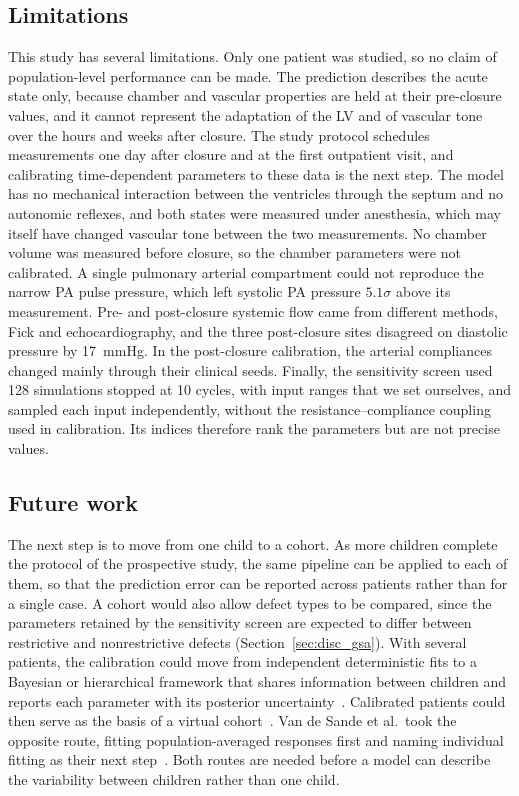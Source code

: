 \FloatBarrier
\subsection{Limitations}
This study has several limitations. Only one patient was studied, so no claim of population-level performance can be made. The prediction describes the acute state only, because chamber and vascular properties are held at their pre-closure values, and it cannot represent the adaptation of the LV and of vascular tone over the hours and weeks after closure. The study protocol schedules measurements one day after closure and at the first outpatient visit, and calibrating time-dependent parameters to these data is the next step. The model has no mechanical interaction between the ventricles through the septum and no autonomic reflexes, and both states were measured under anesthesia, which may itself have changed vascular tone between the two measurements. No chamber volume was measured before closure, so the chamber parameters were not calibrated. A single pulmonary arterial compartment could not reproduce the narrow PA pulse pressure, which left systolic PA pressure $5.1\sigma$ above its measurement. Pre- and post-closure systemic flow came from different methods, Fick and echocardiography, and the three post-closure sites disagreed on diastolic pressure by 17~mmHg. In the post-closure calibration, the arterial compliances changed mainly through their clinical seeds. Finally, the sensitivity screen used 128 simulations stopped at 10 cycles, with input ranges that we set ourselves, and sampled each input independently, without the resistance--compliance coupling used in calibration. Its indices therefore rank the parameters but are not precise values.

\subsection{Future work}
\label{sec:disc_future}
The next step is to move from one child to a cohort. As more children complete the protocol of the prospective study, the same pipeline can be applied to each of them, so that the prediction error can be reported across patients rather than for a single case. A cohort would also allow defect types to be compared, since the parameters retained by the sensitivity screen are expected to differ between restrictive and nonrestrictive defects (Section~\ref{sec:disc_gsa}). With several patients, the calibration could move from independent deterministic fits to a Bayesian or hierarchical framework that shares information between children and reports each parameter with its posterior uncertainty~\cite{Schiavazzi2017,Colebank2024Guidelines}. Calibrated patients could then serve as the basis of a virtual cohort~\cite{Niederer2020}. Van de Sande et al.\ took the opposite route, fitting population-averaged responses first and naming individual fitting as their next step~\cite{vandeSande2026}. Both routes are needed before a model can describe the variability between children rather than one child.

